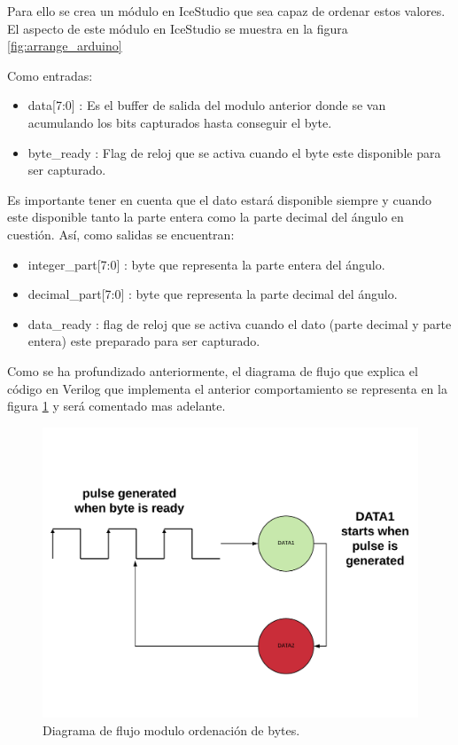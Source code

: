 Para ello se crea un módulo en IceStudio que sea capaz de ordenar estos valores. El aspecto de este módulo en IceStudio se muestra en la figura \ref{fig:arrange_arduino}

Como entradas:

\begin{itemize}
	\item data[7:0] : Es el buffer de salida del modulo anterior donde se van acumulando los bits capturados hasta conseguir el byte.
	\item byte\_ready : Flag de reloj que se activa cuando el byte este disponible para ser capturado.
\end{itemize}

Es importante tener en cuenta que el dato estará disponible siempre y cuando este disponible tanto la parte entera como la parte decimal del ángulo en cuestión. Así, como salidas se encuentran:

\begin{itemize}
	\item integer\_part[7:0] : byte que representa la parte entera del ángulo.
	\item decimal\_part[7:0] : byte que representa la parte decimal del ángulo.
	\item data\_ready : flag de reloj que se activa cuando el dato (parte decimal y parte entera) este preparado para ser capturado.	
\end{itemize}

Como se ha profundizado anteriormente, el diagrama de flujo que explica el código en Verilog que implementa el anterior comportamiento se representa en la figura \ref{fig:arrange_angle} y será comentado mas adelante.

\begin{figure}[H]
	\center
	\includegraphics[scale=0.5]{imagenes/Balancing_robot/arrange_angle.pdf}
	\caption{Diagrama de flujo modulo ordenación de bytes.}
	\label{fig:arrange_angle}
\end{figure}



